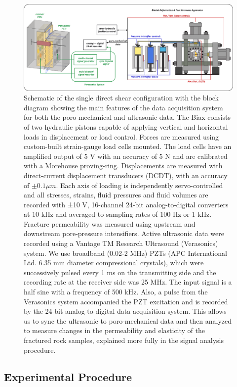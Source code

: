 \documentclass[letterpaper,10pt]{article}
\begin{document}
\begin{figure}[ht]
	\centering
	\includegraphics[width=0.9 \columnwidth]{exp_daq_v1}
	\caption[]{Schematic of the single direct shear configuration with the block diagram showing the main features of the data acquisition system for both the poro-mechanical and ultrasonic data. The Biax consists of two hydraulic pistons capable of applying vertical and horizontal loads in displacement or load control. Forces are measured using custom-built strain-gauge load cells mounted. The load cells have an amplified output of 5 V with an accuracy of 5 N and are calibrated with a Morehouse proving-ring. Displacements are measured with direct-current displacement transducers (DCDT), with an accuracy of $\pm 0.1 \mu m$. Each axis of loading is independently servo-controlled and all stresses, strains, fluid pressures and fluid volumes are recorded with ±10 V, 16-channel 24-bit analog-to-digital converters at 10 kHz and averaged to sampling rates of 100 Hz or 1 kHz. Fracture permeability was measured using upstream and downstream pore-pressure intensifiers. Active ultrasonic data were recorded using a Vantage TM Research Ultrasound (Verasonics) system. We use broadband (0.02-2 MHz) PZTs (APC International Ltd. 6.35 mm diameter compressional crystals), which were successively pulsed every 1 ms on the transmitting side and the recording rate at the receiver side was 25 MHz. The input signal is a half sine with a frequency of 500 kHz. Also, a pulse from the Verasonics system accompanied the PZT excitation and is recorded by the 24-bit analog-to-digital data acquisition system. This allows us to sync the ultrasonic to poro-mechanical data and then analyzed to measure changes in the permeability and elasticity of the fractured rock samples, explained more fully in the signal analysis procedure.}
	\label{fig:data_aq}
\end{figure}

\newpage


\subsection{Experimental Procedure}
\end{document}
